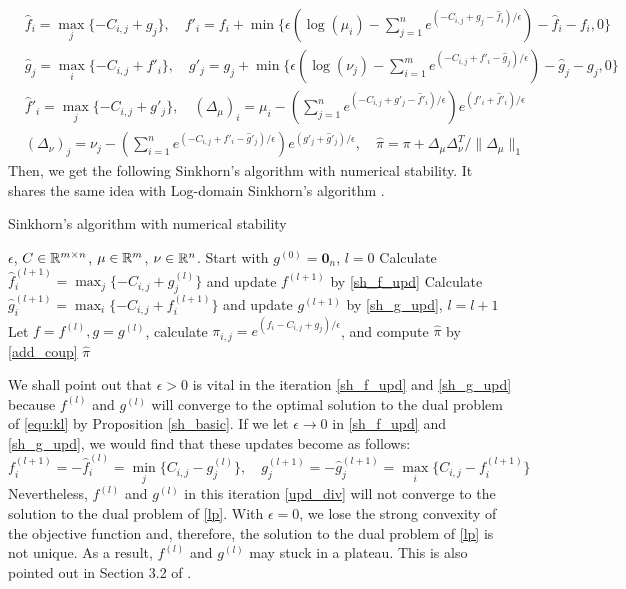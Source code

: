 \begin{equation}
\label{add_coup}
\begin{aligned}
&\hat f_i=\max_j\{-C_{i,j}+g_j\}, \quad f'_i=f_i+\min\{\epsilon(\log(\mu_i)-\sum_{j=1}^ne^{ (-C_{i,j}+g_j-\hat f_i)/\epsilon})-\hat f_i-f_i,0\}\\
&\hat g_j=\max_i\{-C_{i,j}+f'_i\}, \quad g'_j=g_j+\min\{\epsilon(\log(\nu_j)-\sum_{i=1}^me^{ (-C_{i,j}+f'_i-\hat g_j)/\epsilon})-\hat g_j-g_j,0\}\\
&\hat f'_i=\max_j\{-C_{i,j}+g'_j\}, \quad (\Delta_\mu)_i=\mu_i-(\sum_{j=1}^ne^{ (-C_{i,j}+g'_j-\hat f'_i)/\epsilon})e^{(f'_i+\hat f'_i)/\epsilon}\\
&(\Delta_\nu)_j=\nu_j-(\sum_{i=1}^ne^{ (-C_{i,j}+f'_i-\hat g'_j)/\epsilon})e^{(g'_j+\hat g'_j)/\epsilon}, \quad \hat\pi=\pi+\Delta_\mu\Delta_\nu^T/\|\Delta_\mu\|_1
\end{aligned}
\end{equation}
Then, we get the following Sinkhorn's algorithm with numerical stability. It shares the same idea with Log-domain Sinkhorn's algorithm \cite{COT}. 
\begin{algorithm}
\caption{Sinkhorn's algorithm with numerical stability}
\label{alg:sans}
\begin{algorithmic}[1]
\REQUIRE $\epsilon$, $C\in\mathbb{R}^{m\times n}$, $\mu\in\mathbb{R}^m$, $\nu\in\mathbb{R}^n$.
\STATE Start with $g^{(0)}=\mathbf{0}_n$, $l=0$
	\STATE Calculate $\hat f^{(l+1)}_i=\max_j\{-C_{i,j}+g^{(l)}_j\}$ and update $f^{(l+1)}$ by \ref{sh_f_upd}
	\STATE Calculate $\hat g^{(l+1)}_i=\max_i\{-C_{i,j}+f^{(l+1)}_i\}$ and update $g^{(l+1)}$ by \ref{sh_g_upd}, $l=l+1$
\ENDWHILE
\STATE Let $f=f^{(l)}, g=g^{(l)}$, calculate $\pi_{i,j}=e^{(f_i-C_{i,j}+g_j)/\epsilon}$, and compute $\hat\pi$ by \ref{add_coup}
\RETURN $\hat \pi$
\end{algorithmic}
\end{algorithm}

We shall point out that $\epsilon>0$ is vital in the iteration \ref{sh_f_upd} and \ref{sh_g_upd} because $f^{(l)}$ and $g^{(l)}$ will converge to the optimal solution to the dual problem of \ref{equ:kl} by Proposition \ref{sh_basic}. If we let $\epsilon\to 0$ in \ref{sh_f_upd} and \ref{sh_g_upd}, we would find that these updates become as follows:
\begin{equation}
\label{upd_div}
f_i^{(l+1)}=-\hat f_i^{(l)}=\min_j\{C_{i,j}-g^{(l)}_j\}, \quad g_j^{(l+1)}=-\hat g^{(l+1)}_j = \max_i\{C_{i,j}-f^{(l+1)}_i\}
\end{equation}
Nevertheless, $f^{(l)}$ and $g^{(l)}$ in this iteration \ref{upd_div} will not converge to the solution to the dual problem of \ref{lp}. With $\epsilon=0$, we lose the strong convexity of the objective function and, therefore, the solution to the dual problem of \ref{lp} is not unique. As a result,  $f^{(l)}$ and $g^{(l)}$ may stuck in a plateau. This is also pointed out in Section 3.2 of \cite{COT}. 

